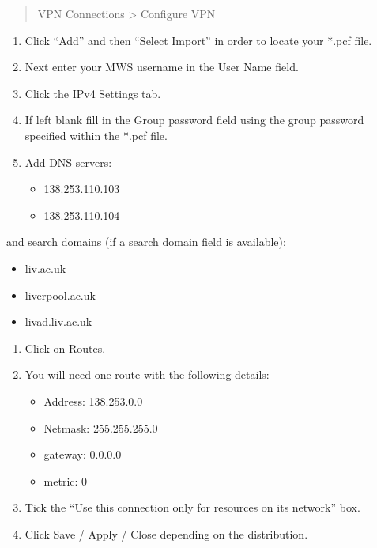 \documentclass[
]{book}
\providecommand{\tightlist}{%
  \setlength{\itemsep}{0pt}\setlength{\parskip}{0pt}}
\begin{document}
\begin{quote}
VPN Connections \textgreater{} Configure VPN
\end{quote}

\begin{enumerate}
\def\labelenumi{\arabic{enumi})}
\item
  Click ``Add'' and then ``Select Import'' in order to locate your *.pcf file.
\item
  Next enter your MWS username in the User Name field.
\item
  Click the IPv4 Settings tab.
\item
  If left blank fill in the Group password field using the group password specified within the *.pcf file.
\item
  Add DNS servers:

  \begin{itemize}
  \tightlist
  \item
    138.253.110.103
  \item
    138.253.110.104
  \end{itemize}
\end{enumerate}

and search domains (if a search domain field is available):

\begin{itemize}
\tightlist
\item
  liv.ac.uk
\item
  liverpool.ac.uk
\item
  livad.liv.ac.uk
\end{itemize}

\begin{enumerate}
\def\labelenumi{\arabic{enumi})}
\item
  Click on Routes.
\item
  You will need one route with the following details:

  \begin{itemize}
  \tightlist
  \item
    Address: 138.253.0.0
  \item
    Netmask: 255.255.255.0
  \item
    gateway: 0.0.0.0
  \item
    metric: 0
  \end{itemize}
\item
  Tick the ``Use this connection only for resources on its network'' box.
\item
  Click Save / Apply / Close depending on the distribution.
\end{enumerate}
\end{document}

